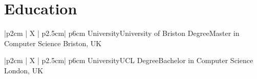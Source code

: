
\section{Education}
\begin{mySectionContents}
%
%
\iftrue %
\begin{myTableEnv}{|p{2cm} | X | p{2.5cm}| p{6cm}}
    \myRow
        {\myPeriod}{}%
        {University}{University of Briston} %
    \myRow
        {Degree}{Master in Computer Science} %
        {\myLocation}{Briston, UK}%
    \myTableContents{
    }
\end{myTableEnv}
%
%
\myTablesSeparator
%
%
\fi
%
%
\iftrue %
\begin{myTableEnv}{|p{2cm} | X | p{2.5cm}| p{6cm}}
    \myRow
        {\myPeriod}{}%
        {University}{UCL} %
    \myRow
        {Degree}{Bachelor in Computer Science} %
        {\myLocation}{London, UK}%

\end{myTableEnv}
%
%
\myTablesSeparator
%
%
\fi
%
%
\end{mySectionContents}
